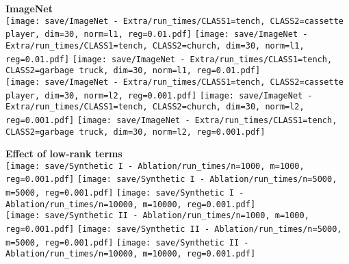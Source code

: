 {    \begin{minipage}[c]{0.48\textwidth}
        \centering
        \vspace{1em}
        {\bf\color{sufered} ImageNet} \\ \vspace{0.3em}
        \texttt{[image: save/ImageNet - Extra/run\_times/CLASS1=tench, CLASS2=cassette player, dim=30, norm=l1, reg=0.01.pdf]}
        \texttt{[image: save/ImageNet - Extra/run\_times/CLASS1=tench, CLASS2=church, dim=30, norm=l1, reg=0.01.pdf]}
        \texttt{[image: save/ImageNet - Extra/run\_times/CLASS1=tench, CLASS2=garbage truck, dim=30, norm=l1, reg=0.01.pdf]} \\
        \texttt{[image: save/ImageNet - Extra/run\_times/CLASS1=tench, CLASS2=cassette player, dim=30, norm=l2, reg=0.001.pdf]}
        \texttt{[image: save/ImageNet - Extra/run\_times/CLASS1=tench, CLASS2=church, dim=30, norm=l2, reg=0.001.pdf]}
        \texttt{[image: save/ImageNet - Extra/run\_times/CLASS1=tench, CLASS2=garbage truck, dim=30, norm=l2, reg=0.001.pdf]} \\
    \end{minipage}
    \hfill
    \begin{minipage}[c]{0.48\textwidth}
        \centering
        \vspace{1em}
        {\bf\color{sufered} Effect of low-rank terms} \\ \vspace{0.3em}
        \texttt{[image: save/Synthetic I - Ablation/run\_times/n=1000, m=1000, reg=0.001.pdf]}
        \texttt{[image: save/Synthetic I - Ablation/run\_times/n=5000, m=5000, reg=0.001.pdf]}
        \texttt{[image: save/Synthetic I - Ablation/run\_times/n=10000, m=10000, reg=0.001.pdf]} \\
        \texttt{[image: save/Synthetic II - Ablation/run\_times/n=1000, m=1000, reg=0.001.pdf]}
        \texttt{[image: save/Synthetic II - Ablation/run\_times/n=5000, m=5000, reg=0.001.pdf]}
        \texttt{[image: save/Synthetic II - Ablation/run\_times/n=10000, m=10000, reg=0.001.pdf]} \\
    \end{minipage}

}
